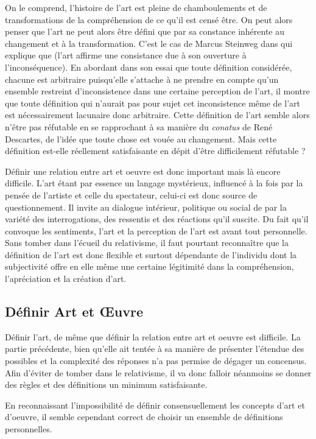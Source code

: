 \documentclass[12pt]{article} %
\begin{document}
On le comprend, l'histoire de l'art est pleine de chamboulements et de transformations de la compréhension de ce qu'il est censé être. On peut alors penser que l'art ne peut alors être défini que par sa constance inhérente au changement et à la transformation. C'est le cas de Marcus Steinweg dans  qui explique que  (l'art affirme une consistance due à son ouverture à l'inconséquence). En abordant dans son essai que toute définition considérée, chacune est arbitraire puisqu'elle s'attache à ne prendre en compte qu'un ensemble restreint d'inconsistence dans une certaine perception de l'art, il montre que toute définition qui n'aurait pas pour sujet cet inconsistence même de l'art est nécessairement lacunaire donc arbitraire. Cette définition de l'art semble alors n'être pas réfutable en se rapprochant à sa manière du \textit{conatus} de René Descartes, de l'idée que toute chose est vouée au changement. Mais cette définition est-elle réellement satisfaisante en dépit d'être difficilement réfutable ?

Définir une relation entre art et oeuvre est donc important mais là encore difficile.  L'art étant par essence un langage mystérieux, influencé à la fois par la pensée de l'artiste et celle du spectateur, celui-ci est donc source de questionnement. Il invite au dialogue intérieur, politique ou social de par la variété des interrogations, des ressentis et des réactions qu'il suscite. Du fait qu'il convoque les sentiments, l'art et la perception de l'art est avant tout personnelle. Sans tomber dans l'écueil du relativisme, il faut pourtant reconnaître que la définition de l'art est donc flexible et surtout dépendante de l'individu dont la subjectivité offre en elle même une certaine légitimité dans la compréhension, l'apréciation et la création d'art. 

\subsection{Définir Art et Œuvre}
Définir l'art, de même que définir la relation entre art et oeuvre est difficile. La partie précédente, bien qu'elle ait tentée à sa manière de présenter l'étendue des possibles et la complexité des réponses n'a pas permise de dégager un concensus. Afin d'éviter de tomber dans le relativisme, il va donc falloir néanmoins se donner des règles et des définitions un minimum satisfaisante. 

En reconnaissant l'impossibilité de définir consensuellement les concepts d'art et d'oeuvre, il semble cependant correct de choisir un ensemble de définitions personnelles.
\end{document}
